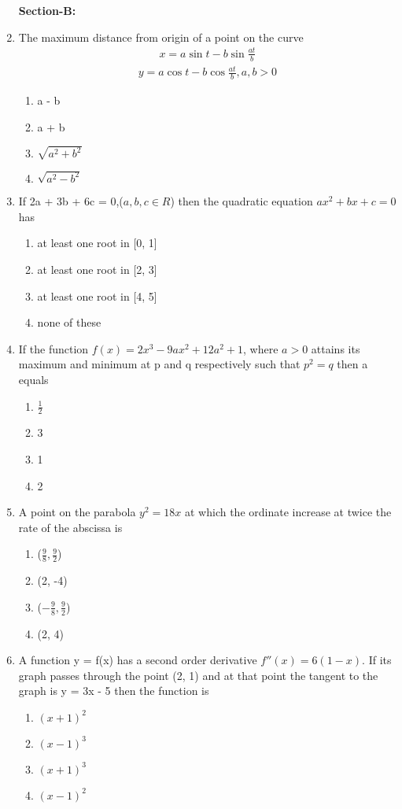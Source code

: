 \begin{enumerate}[label=\arabic*.,ref=\thesubsection.\theenumi]
\textbf{Section-B:}


\item The maximum distance from origin of a point on the curve 
\begin{align*}
x = a\sin t - b\sin\frac{at}{b}
\end{align*}
\begin{align*}
y = a\cos t - b\cos \frac{at}{b}, a, b > 0
\end{align*}
\begin{enumerate}
\item a - b
\item a + b
\item $\sqrt{a^2 + b^2}$
\item $\sqrt{a^2 - b^2}$
\end{enumerate}

\item If 2a + 3b + 6c = 0,($a, b, c \in R$) then the quadratic equation $ax^2 + bx + c = 0$ has 
\begin{enumerate}
\item at least one root in [0, 1]
\item at least one root in [2, 3]
\item at least one root in [4, 5]
\item none of these
\end{enumerate}

\item If the function $f(x) = 2x^3 - 9ax^2 + 12a^2 + 1$, where $a > 0$ attains its maximum and  minimum at p and q respectively such that $p^2 = q$ then a equals
\begin{enumerate}
\item $\frac{1}{2}$
\item 3
\item 1
\item 2
\end{enumerate}

\item A point on the parabola $y^2 = 18x$ at which the ordinate increase at twice the rate of the abscissa is \begin{enumerate}
\item ($\frac{9}{8}, \frac{9}{2}$)
\item (2, -4)
\item ($-\frac{9}{8}, \frac{9}{2}$)
\item (2, 4)
\end{enumerate}
    
\item A function y = f(x) has a second order derivative $f''(x) = 6(1 - x)$. If its graph passes through the point (2, 1) and at that point the tangent to the graph is y = 3x - 5 then the function is
\begin{enumerate}
\item $(x + 1)^2$
\item $(x - 1)^3$
\item $(x + 1)^3$
\item $(x - 1)^2$
\end{enumerate}


\end{enumerate}
